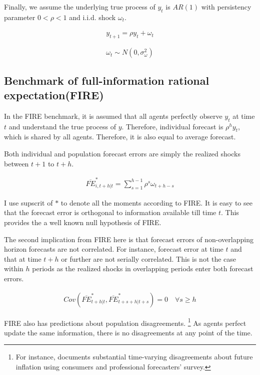 \documentclass[]{article}
\begin{document}
	Finally, we assume the underlying true process of $y_{t}$ is $AR(1)$ with persistency parameter $0<\rho <1$ and i.i.d. shock $\omega_t$. 
	
	\begin{eqnarray}\label{AR_process}
		y_{t+1} = \rho y_t + \omega_t
	\end{eqnarray}
	
	$$\omega_t \sim N(0,\sigma^2_{\omega})$$
	
	\subsection{Benchmark of full-information rational expectation(FIRE)}
	
	In the FIRE benchmark,  it is assumed that all agents perfectly observe $y_t$ at time $t$ and understand the true process of $y$. Therefore, individual forecast is $\rho^h y_t $, which is shared by all agents. Therefore, it is also equal to average forecast. 
	
	Both individual and population forecast errors are simply the realized shocks between $t+1$ to $t+h$.  
	
	\begin{eqnarray}\label{NoPastInfFE}
		\overline{FE}^{*}_{i,t+h|t} = \sum^{h-1}_{s=1} \rho^s \omega_{t+h-s}
	\end{eqnarray}
	
	I use supscrit of $*$ to denote all the moments according to FIRE. It is easy to see that the forecast error is orthogonal to information available till time $t$. This provides the a well known null hypothesis of FIRE. \citet{xx}
	
	The second implication from FIRE here is that forecast errors of non-overlapping horizon forecasts are not correlated. For instance, forecast error at time $t$ and that at time $t+h$ or further are not serially correlated. This is not the case within $h$ periods as the realized shocks in overlapping periods enter both forecast errors. 
	
	\begin{eqnarray}\label{NoSerialCorrFE}
		Cov(\overline{FE}^{*}_{t+h|t}, \overline{FE}^{*}_{t+s+h|t+s}) = 0 \quad \forall s \geq h
	\end{eqnarray}
	
	FIRE also has predictions about  population disagreements. \footnote{For instance, \citet{mankiw2003disagreement} documents substantial time-varying disagreements about future inflation using consumers and professional forecasters' survey. } As agents perfect update the same information, there is no disagreements at any point of the time. 
	
\end{document}
